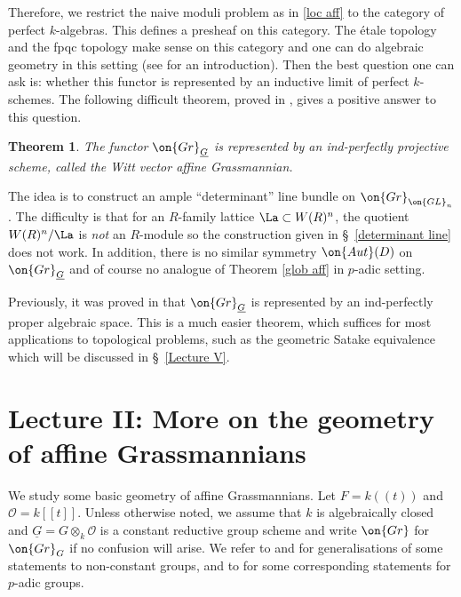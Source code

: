 \documentclass[]{pcmi}
\theoremstyle{plain}
\newtheorem{thm}[equation]{Theorem}
\theoremstyle{remark}
\theoremstyle{definition}
\newcommand{\mO}{{\mathcal O}}
\newcommand{\Aut}{{\on{Aut}}}
\newcommand{\Gr}{{\on{Gr}}}
\newcommand{\GL}{{\on{GL}}}
\begin{document}
Therefore, we restrict the naive moduli problem as in \eqref{loc aff} to the category of perfect $k$-algebras. This defines a presheaf on this category. The \'etale topology and the fpqc topology make sense on this category and one can do algebraic geometry in this setting (see \cite[Appendix A]{Z14} for an introduction).
Then the best question one can ask is: whether this functor is represented by an inductive limit of perfect $k$-schemes. 
The following difficult theorem,  proved in \cite{BS}, gives a positive answer to this question.
\begin{thm}The functor $\Gr_{\underline G}$ is represented by an ind-perfectly projective scheme, called the Witt vector affine Grassmannian.
\end{thm}
The idea is to construct an ample ``determinant'' line bundle on $\Gr_{\GL_n}$. The difficulty is that for an $R$-family lattice $\La\subset W(R)^n$, the quotient $W(R)^n/\La$ is \emph{not} an $R$-module so  the construction given in \S\ \ref{determinant line} does not work. In addition, there is no similar symmetry $\Aut(D)$ on $\Gr_{\underline G}$ and of course no analogue of Theorem \ref{glob aff}  in $p$-adic setting.

Previously, it was proved in \cite[\S~1]{Z14} that $\Gr_{\underline G}$ is represented by an ind-perfectly proper algebraic space.
This is a much easier theorem, which suffices for most applications to topological problems, such as the geometric Satake equivalence which will be discussed in \S\ \ref{Lecture V}.




\section{Lecture II: More on the geometry of affine Grassmannians}\label{Lecture II}
We study some basic  geometry of affine Grassmannians. Let $F=k((t))$ and $\mO=k[[t]]$. Unless otherwise noted, we assume that $k$ is algebraically closed and $\underline G=G\otimes_k \mO$ is a constant reductive group scheme and write $\Gr$ for $\Gr_{G}$ if no confusion will arise. We refer to \cite{PR} and \cite[\S\ 6.3]{Z11} for generalisations of some statements to non-constant groups, and to \cite{Z14} for some corresponding statements for $p$-adic groups.  
\end{document}
